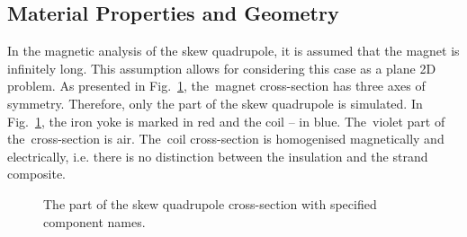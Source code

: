 
\subsection{Material Properties and Geometry}

In the magnetic analysis of the skew quadrupole, it is assumed that the magnet is infinitely long. This assumption allows for considering this case as a plane 2D problem. As presented in Fig.~\ref{fig:skew_quad_geometry_ansys}, the~magnet cross-section has three axes of symmetry. Therefore, only the  part of the skew quadrupole is simulated. In Fig.~\ref{fig:skew_quad_geometry_ansys}, the iron yoke is marked in red and the coil -- in blue. The~violet part of the~cross-section is air. The~coil cross-section is homogenised magnetically and electrically, i.e. there is no distinction between the insulation and the strand composite. 

\begin{figure}[H]
    \centering
    \caption{The  part of the skew quadrupole cross-section with specified component names.}
    \label{fig:skew_quad_geometry_ansys}
\end{figure}

